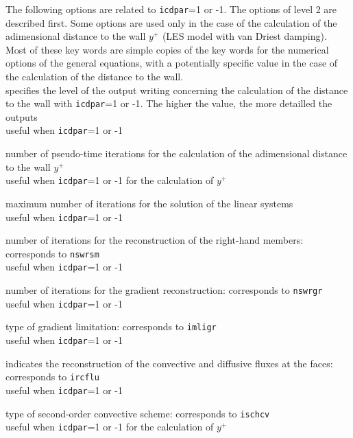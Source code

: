 The following options are related to {\tt icdpar}=1 or -1. The options of
level 2 are described first. Some options are used only in the case of
the calculation of the adimensional distance to the wall $y^+$ (LES model with
van Driest damping). Most of these key words are simple copies of the
key words for the numerical options of the general equations, with a potentially
specific value in the case of the calculation of the distance to the wall.\\

{specifies the level of the output writing concerning the calculation of the
distance to the wall with {\tt icdpar}=1 or -1. The higher the value, the more
detailled the outputs\\
useful when {\tt icdpar}=1 or -1}

{number of pseudo-time iterations for the calculation of the adimensional
distance to the wall $y^+$\\
useful when {\tt icdpar}=1 or -1 for the calculation of $y^+$}

{maximum number of iterations for the solution of the linear systems\\
useful when {\tt icdpar}=1 or -1}

{number of iterations for the reconstruction of the right-hand members:
corresponds to {\tt nswrsm}\\
useful when {\tt icdpar}=1 or -1}

{number of iterations for the gradient reconstruction: corresponds to {\tt nswrgr}\\
useful when {\tt icdpar}=1 or -1}

{type of gradient limitation: corresponds to {\tt imligr}\\
useful when {\tt icdpar}=1 or -1}

{indicates the reconstruction of the convective and diffusive fluxes at
the faces: corresponds to {\tt ircflu}\\
useful when {\tt icdpar}=1 or -1}

{type of second-order convective scheme: corresponds to {\tt ischcv}\\
useful when {\tt icdpar}=1 or -1 for the calculation of $y^+$}

